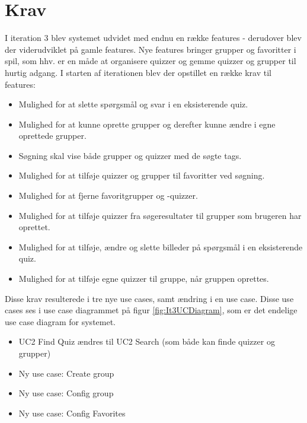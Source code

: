 \section{Krav}

I iteration 3 blev systemet udvidet med endnu en række features - derudover blev der viderudviklet på gamle features. Nye features bringer grupper og favoritter i spil, som hhv. er en måde at organisere quizzer og gemme quizzer og grupper til hurtig adgang.
I starten af iterationen blev der opstillet en række krav til features:

\begin{itemize}
	\item Mulighed for at slette spørgsmål og svar i en eksisterende quiz.
	\item Mulighed for at kunne oprette grupper og derefter kunne ændre i egne oprettede grupper.
	\item Søgning skal vise både grupper og quizzer med de søgte tags.
	\item Mulighed for at tilføje quizzer og grupper til favoritter ved søgning.
	\item Mulighed for at fjerne favoritgrupper og -quizzer.
	\item Mulighed for at tilføje quizzer fra søgeresultater til grupper som brugeren har oprettet.
	\item Mulighed for at tilføje, ændre og slette billeder på spørgsmål i en eksisterende quiz.
	\item Mulighed for at tilføje egne quizzer til gruppe, når gruppen oprettes.
\end{itemize}

Disse krav resulterede i tre nye use cases, samt ændring i en use case. Disse use cases ses i use case diagrammet på figur \ref{fig:It3UCDiagram}, som er det endelige use case diagram for systemet.

\begin{itemize}
	\item UC2 Find Quiz ændres til UC2 Search (som både kan finde quizzer og grupper)
	\item Ny use case: Create group
	\item Ny use case: Config group
	\item Ny use case: Config Favorites
\end{itemize}

